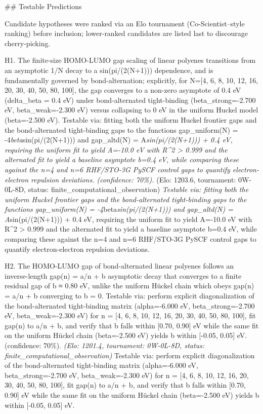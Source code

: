 \documentclass[11pt,a4paper]{article}
\begin{document}
\#\# Testable Predictions

Candidate hypotheses were ranked via an Elo tournament (Co-Scientist–style ranking) before inclusion; lower-ranked candidates are listed last to discourage cherry-picking.

H1. The finite-size HOMO-LUMO gap scaling of linear polyenes transitions from an asymptotic 1/N decay to a sin(pi/(2(N+1))) dependence, and is fundamentally governed by bond-alternation; explicitly, for N=[4, 6, 8, 10, 12, 16, 20, 30, 40, 50, 80, 100], the gap converges to a non-zero asymptote of 0.4 eV (delta\_beta = 0.4 eV) under bond-alternated tight-binding (beta\_strong=-2.700 eV, beta\_weak=-2.300 eV) versus collapsing to 0 eV in the uniform Huckel model (beta=-2.500 eV). Testable via: fitting both the uniform Huckel frontier gaps and the bond-alternated tight-binding gaps to the functions gap\_uniform(N) = -4\textit{beta}sin(pi/(2(N+1))) and gap\_altd(N) = A\textit{sin(pi/(2(N+1))) + 0.4 eV, requiring the uniform fit to yield A=-10.0 eV with R\textasciicircum{}2 > 0.999 and the alternated fit to yield a baseline asymptote b=0.4 eV, while comparing these against the n=4 and n=6 RHF/STO-3G PySCF control gaps to quantify electron-electron repulsion deviations. (confidence: 70\%). }(Elo: 1203.6, tournament: 0W-0L-8D, status: finite\_computational\_observation)\textit{ Testable via: fitting both the uniform Huckel frontier gaps and the bond-alternated tight-binding gaps to the functions gap\_uniform(N) = -4}beta\textit{sin(pi/(2(N+1))) and gap\_altd(N) = A}sin(pi/(2(N+1))) + 0.4 eV, requiring the uniform fit to yield A=-10.0 eV with R\textasciicircum{}2 > 0.999 and the alternated fit to yield a baseline asymptote b=0.4 eV, while comparing these against the n=4 and n=6 RHF/STO-3G PySCF control gaps to quantify electron-electron repulsion deviations.

H2. The HOMO-LUMO gap of bond-alternated linear polyenes follows an inverse-length gap(n) = a/n + b asymptotic decay that converges to a finite residual gap of b ≈ 0.80 eV, unlike the uniform Hückel chain which obeys gap(n) = a/n + b converging to b = 0. Testable via: perform explicit diagonalization of the bond-alternated tight-binding matrix (alpha=-6.000 eV, beta\_strong=-2.700 eV, beta\_weak=-2.300 eV) for n = [4, 6, 8, 10, 12, 16, 20, 30, 40, 50, 80, 100], fit gap(n) to a/n + b, and verify that b falls within [0.70, 0.90] eV while the same fit on the uniform Hückel chain (beta=-2.500 eV) yields b within [-0.05, 0.05] eV. (confidence: 70\%). \textit{(Elo: 1201.4, tournament: 0W-0L-8D, status: finite\_computational\_observation)} Testable via: perform explicit diagonalization of the bond-alternated tight-binding matrix (alpha=-6.000 eV, beta\_strong=-2.700 eV, beta\_weak=-2.300 eV) for n = [4, 6, 8, 10, 12, 16, 20, 30, 40, 50, 80, 100], fit gap(n) to a/n + b, and verify that b falls within [0.70, 0.90] eV while the same fit on the uniform Hückel chain (beta=-2.500 eV) yields b within [-0.05, 0.05] eV.
\end{document}
